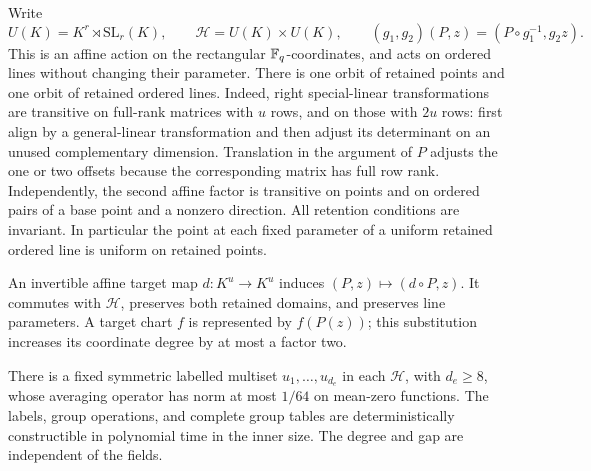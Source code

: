 Write
\[
 U(K)=K^r\rtimes\mathrm{SL}_r(K),\qquad
 \mathcal H=U(K)\times U(K),\qquad
 (g_1,g_2)(P,z)=(P\circ g_1^{-1},g_2z).
\]
This is an affine action on the rectangular \(\mathbb{F}_q\)-coordinates,
and acts on ordered lines without changing their parameter.  There
is one orbit of retained points and one orbit of retained ordered
lines.  Indeed, right special-linear transformations are transitive
on full-rank matrices with \(u\) rows, and on those with \(2u\)
rows: first align by a general-linear transformation and then adjust
its determinant on an unused complementary dimension.  Translation
in the argument of \(P\) adjusts the one or two offsets because the
corresponding matrix has full row rank.  Independently, the second
affine factor is transitive on points and on ordered pairs of a base
point and a nonzero direction.  All retention conditions are
invariant.  In particular the point at each fixed parameter of a
uniform retained ordered line is uniform on retained points.

An invertible affine target map \(d:K^u\to K^u\) induces
\((P,z)\mapsto(d\circ P,z)\).  It commutes with \(\mathcal H\),
preserves both retained domains, and preserves line parameters.  A
target chart \(f\) is represented by \(f(P(z))\); this substitution
increases its coordinate degree by at most a factor two.

\begin{lemma}
\label{ib:affine-expansion}
There is a fixed symmetric labelled multiset
\(u_1,\ldots,u_{d_e}\) in each \(\mathcal H\), with \(d_e\ge8\),
whose averaging operator has norm at most \(1/64\) on mean-zero
functions.  The labels, group operations, and complete group tables
are deterministically constructible in polynomial time in the inner
size.  The degree and gap are independent of the fields.
\end{lemma}

